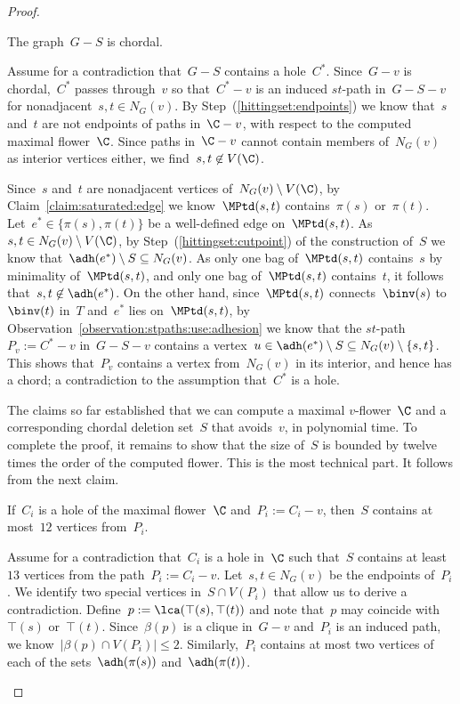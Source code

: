 \begin{proof}
\begin{claim} \label{claim:s:hittingset}
The graph~$G - S$ is chordal.
\end{claim}
\begin{claimproof}
Assume for a contradiction that~$G - S$ contains a hole~$C^*$. Since~$G-v$ is chordal,~$C^*$ passes through~$v$ so that~$C^* - v$ is an induced $st$-path in~$G-S-v$ for nonadjacent~$s,t \in N_G(v)$. By Step~(\ref{hittingset:endpoints}) we know that~$s$ and~$t$ are not endpoints of paths in~$\C - v$, with respect to the computed maximal flower~$\C$. Since paths in~$\C - v$ cannot contain members of~$N_G(v)$ as interior vertices either, we find~$s,t \not \in V(\C)$.

Since~$s$ and~$t$ are nonadjacent vertices of~$N_G(v) \setminus V(\C)$, by Claim~\ref{claim:saturated:edge} we know~$\MPtd(s,t)$ contains~$\pi(s)$ or~$\pi(t)$. Let~$e^* \in \{\pi(s), \pi(t)\}$ be a well-defined edge on~$\MPtd(s,t)$. As~$s, t \in N_G(v) \setminus V(\C)$, by Step~(\ref{hittingset:cutpoint}) of the construction of~$S$ we know that~$\adh(e^*) \setminus S \subseteq N_G(v)$. As only one bag of~$\MPtd(s,t)$ contains~$s$ by minimality of~$\MPtd(s,t)$, and only one bag of~$\MPtd(s,t)$ contains~$t$, it follows that~$s,t \not \in \adh(e^*)$. On the other hand, since~$\MPtd(s,t)$ connects~$\binv(s)$ to~$\binv(t)$ in~$T$ and~$e^*$ lies on~$\MPtd(s,t)$, by Observation~\ref{observation:stpaths:use:adhesion} we know that the $st$-path~$P_v := C^* - v$ in~$G - S - v$ contains a vertex~$u \in \adh(e^*) \setminus S \subseteq N_G(v) \setminus \{s,t\}$. This shows that~$P_v$ contains a vertex from~$N_G(v)$ in its interior, and hence has a chord; a contradiction to the assumption that~$C^*$ is a hole.
\end{claimproof}

The claims so far established that we can compute a maximal $v$-flower~$\C$ and a corresponding chordal deletion set~$S$ that avoids~$v$, in polynomial time. To complete the proof, it remains to show that the size of~$S$ is bounded by twelve times the order of the computed flower. This is the most technical part. It follows from the next claim.

\begin{claim} \label{claim:twelve:from:path}
If~$C_i$ is a hole of the maximal flower~$\C$ and~$P_i := C_i - v$, then~$S$ contains at most~$12$ vertices from~$P_i$.
\end{claim}
\begin{claimproof}
Assume for a contradiction that~$C_i$ is a hole in~$\C$ such that~$S$ contains at least~$13$ vertices from the path~$P_i := C_i - v$. Let~$s,t \in N_G(v)$ be the endpoints of~$P_i$. We identify two special vertices in~$S \cap V(P_i)$ that allow us to derive a contradiction. Define~$p := \lca(\top(s), \top(t))$ and note that~$p$ may coincide with~$\top(s)$ or~$\top(t)$. Since~$\beta(p)$ is a clique in~$G-v$ and~$P_i$ is an induced path, we know~$|\beta(p) \cap V(P_i)| \leq 2$. Similarly,~$P_i$ contains at most two vertices of each of the sets~$\adh(\pi(s))$ and~$\adh(\pi(t))$.


\end{claimproof}
\end{proof}
